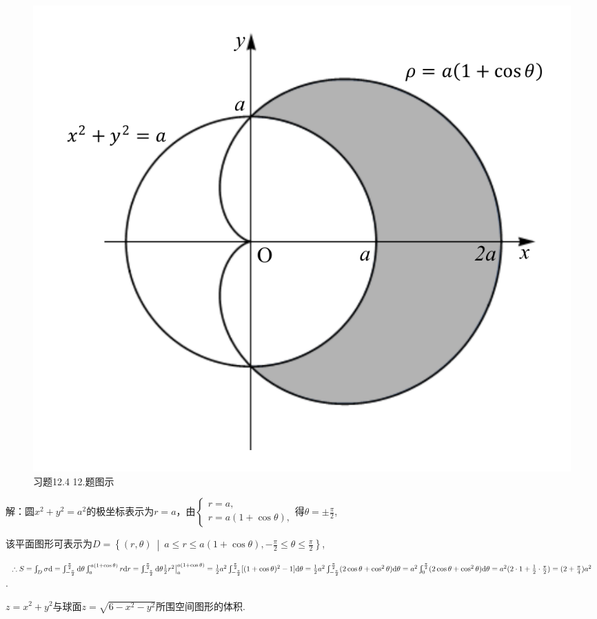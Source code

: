 \documentclass[12pt,UTF8]{ctexart}
\newcommand\Set[2]{\left\{#1\ \middle\vert\ #2 \right\}}
\newcommand{\Int}[4]{\varint\nolimits_{#1}^{#2}#3\mathrm d#4}
\begin{document}
\begin{enumerate}
\begin{figure}[H]
\begin{center}
\includegraphics[height=0.4\textheight]{Figures19/Fig12-4-12.pdf}
\end{center}
\caption{习题12.4 12.题图示}
\label{12-4-12}
\end{figure}

解：圆$x^2+y^2=a^2$的极坐标表示为$r=a$，由$\begin{cases}
r=a,\\
r=a(1+\cos\theta),
\end{cases}$得$\theta=\pm\frac\pi2$,

该平面图形可表示为$D=\Set{(r,\theta)}{a\leqslant r\leqslant a(1+\cos\theta),-\frac\pi2\leqslant\theta\leqslant\frac\pi2}$,

$\therefore S=\Int D{}\sigma=\Int{-\frac\pi2}{\frac\pi2}{}\theta\Int a{a(1+\cos\theta)}rr=\Int{-\frac\pi2}{\frac\pi2}{}\theta\frac12r^2\big|_a^{a(1+\cos\theta)}=\frac12a^2\Int{-\frac\pi2}{\frac\pi2}{[(1+\cos\theta)^2-1]}\theta\\
=\frac12a^2\Int{-\frac\pi2}{\frac\pi2}{(2\cos\theta+\cos^2\theta)}\theta=a^2\Int0{\frac\pi2}{(2\cos\theta+\cos^2\theta)}\theta=a^2(2\cdot1+\frac12\cdot\frac\pi2)=(2+\frac\pi4)a^2$.

$z=x^2+y^2$与球面$z=\sqrt{6-x^2-y^2}$所围空间图形的体积.


\end{enumerate}
\end{document}
